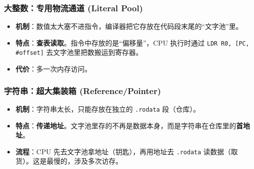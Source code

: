 \subsubsection{大整数：专用物流通道 (Literal Pool)}
\begin{itemize}
    \item \textbf{机制}：数值太大塞不进指令，编译器把它存放在代码段末尾的“文字池”里。
    \item \textbf{特点}：\textbf{查表读取}。指令中存放的是“偏移量”，CPU 执行时通过 \texttt{LDR R0, [PC, \#offset]} 去文字池里把数搬运到寄存器。
    \item \textbf{代价}：多一次内存访问。
\end{itemize}

\subsubsection{字符串：超大集装箱 (Reference/Pointer)}
\begin{itemize}
    \item \textbf{机制}：字符串太长，只能存放在独立的 \texttt{.rodata} 段（仓库）。
    \item \textbf{特点}：\textbf{传递地址}。文字池里存的不再是数据本身，而是字符串在仓库里的\textbf{首地址}。
    \item \textbf{流程}：CPU 先去文字池拿地址（钥匙），再用地址去 \texttt{.rodata} 读数据（取货）。这是最慢的，涉及多次访存。
\end{itemize}






